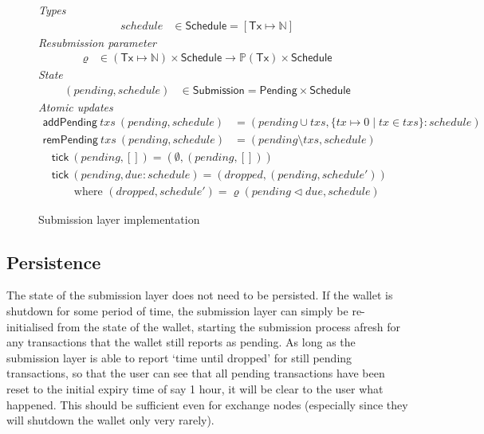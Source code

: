 \documentclass{article}
\newcommand{\restrictdom}{\lhd}
\theoremstyle{definition}{
  \newtheorem{lemma}{Lemma}[section] %
  \newtheorem{definition}[lemma]{Definition}
}
\theoremstyle{theorem}{
  \newtheorem{invariant}[lemma]{Invariant}
  \newtheorem{proofobligation}[lemma]{Proof Obligation}
}
\numberwithin{equation}{lemma}
\begin{document}
\begin{figure}
%
\emph{Types}
%
\begin{align*}
  \mathit{schedule}
& \in \mathsf{Schedule} = [\mathsf{Tx} \mapsto \mathbb{N}]
\end{align*}
%
\emph{Resubmission parameter}
%
\begin{align*}
  \varrho
& \in (\mathsf{Tx} \mapsto \mathbb{N}) \times \mathsf{Schedule} \rightarrow \mathbb{P}(\mathsf{Tx}) \times \mathsf{Schedule}
\end{align*}
%
\emph{State}
%
\begin{align*}
  (\mathit{pending}, \mathit{schedule})
& \in \mathsf{Submission} = \mathsf{Pending} \times \mathsf{Schedule}
\end{align*}
%
\emph{Atomic updates}
%
\begin{align*}
  \mathsf{addPending}
    ~ \mathit{txs}
    ~ (\mathit{pending}, \mathit{schedule})
& = ( \mathit{pending} \cup \mathit{txs}
    , \{ \mathit{tx} \mapsto 0 \mid \mathit{tx} \in \mathit{txs} \} : \mathit{schedule}
    )
\\
  \mathsf{remPending}
    ~ \mathit{txs}
    ~ (\mathit{pending}, \mathit{schedule})
& = ( \mathit{pending} \setminus \mathit{txs}
    , \mathit{schedule}
    )
\end{align*}
\begin{align*}
& \mathsf{tick} ~ (\mathit{pending}, []) = (\emptyset, (\mathit{pending}, [])) \\
& \mathsf{tick} ~ (\mathit{pending}, \mathit{due} : \mathit{schedule})
= (\mathit{dropped}, (\mathit{pending}, \mathit{schedule'})) \\
& \qquad\text{where~} (\mathit{dropped}, \mathit{schedule}')
= \varrho(\mathit{pending} \restrictdom \mathit{due}, \mathit{schedule})
\end{align*}
%
\caption{\label{fig:submission_layer_impl}Submission layer implementation}
\end{figure}

\subsection{Persistence}

The state of the submission layer does not need to be persisted. If the wallet
is shutdown for some period of time, the submission layer can simply be
re-initialised from the state of the wallet, starting the submission process
afresh for any transactions that the wallet still reports as pending. As long
as the submission layer is able to report `time until dropped' for still
pending transactions, so that the user can see that all pending transactions
have been reset to the initial expiry time of say 1 hour, it will be clear to
the user what happened. This should be sufficient even for exchange nodes
(especially since they will shutdown the wallet only very rarely).
\end{document}
